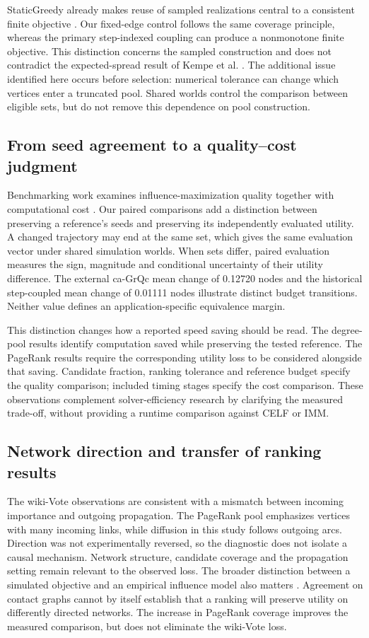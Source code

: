 \documentclass[smallextended]{svjour3}
\begin{document}
StaticGreedy already makes reuse of sampled realizations central to a consistent finite objective \cite{ref8}. Our fixed-edge control follows the same coverage principle, whereas the primary step-indexed coupling can produce a nonmonotone finite objective. This distinction concerns the sampled construction and does not contradict the expected-spread result of Kempe et al. \cite{ref1}. The additional issue identified here occurs before selection: numerical tolerance can change which vertices enter a truncated pool. Shared worlds control the comparison between eligible sets, but do not remove this dependence on pool construction.

\subsection{From seed agreement to a quality--cost judgment}
Benchmarking work examines influence-maximization quality together with computational cost \cite{ref16}. Our paired comparisons add a distinction between preserving a reference's seeds and preserving its independently evaluated utility. A changed trajectory may end at the same set, which gives the same evaluation vector under shared simulation worlds. When sets differ, paired evaluation measures the sign, magnitude and conditional uncertainty of their utility difference. The external ca-GrQc mean change of 0.12720 nodes and the historical step-coupled mean change of 0.01111 nodes illustrate distinct budget transitions. Neither value defines an application-specific equivalence margin.

This distinction changes how a reported speed saving should be read. The degree-pool results identify computation saved while preserving the tested reference. The PageRank results require the corresponding utility loss to be considered alongside that saving. Candidate fraction, ranking tolerance and reference budget specify the quality comparison; included timing stages specify the cost comparison. These observations complement solver-efficiency research by clarifying the measured trade-off, without providing a runtime comparison against CELF or IMM.

\subsection{Network direction and transfer of ranking results}
The wiki-Vote observations are consistent with a mismatch between incoming importance and outgoing propagation. The PageRank pool emphasizes vertices with many incoming links, while diffusion in this study follows outgoing arcs. Direction was not experimentally reversed, so the diagnostic does not isolate a causal mechanism. Network structure, candidate coverage and the propagation setting remain relevant to the observed loss. The broader distinction between a simulated objective and an empirical influence model also matters \cite{ref15}. Agreement on contact graphs cannot by itself establish that a ranking will preserve utility on differently directed networks. The increase in PageRank coverage improves the measured comparison, but does not eliminate the wiki-Vote loss.
\end{document}

